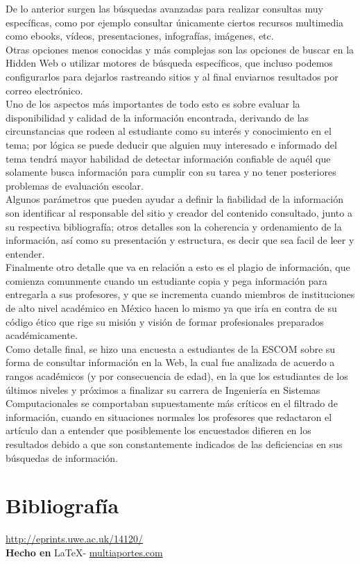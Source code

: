 \documentclass{article}
\begin{document}
{De lo anterior surgen las búsquedas avanzadas para realizar consultas muy específicas, como por ejemplo consultar únicamente ciertos recursos multimedia como ebooks, vídeos, presentaciones, infografías, imágenes, etc.
\\

Otras opciones menos conocidas y más complejas son las opciones de buscar en la Hidden Web o utilizar motores de búsqueda específicos, que incluso podemos configurarlos para dejarlos rastreando sitios y al final enviarnos resultados por correo electrónico.
\\

Uno de los aspectos más importantes de todo esto es sobre evaluar la disponibilidad y calidad de la información encontrada, derivando de las circunstancias que rodeen al estudiante como su interés y conocimiento en el tema; por lógica se puede deducir que alguien muy interesado e informado del tema tendrá mayor habilidad de detectar información confiable de aquél que solamente busca información para cumplir con su tarea y no tener posteriores problemas de evaluación escolar.
\\

Algunos parámetros que pueden ayudar a definir la fiabilidad de la información son identificar al responsable del sitio y creador del contenido consultado, junto a su respectiva bibliografía; otros detalles son la coherencia y ordenamiento de la información, así como su presentación y estructura, es decir que sea facil de leer y entender.
\\

Finalmente otro detalle que va en relación a esto es el plagio de información, que comienza comunmente cuando un estudiante copia y pega información para entregarla a sus profesores, y que se incrementa cuando miembros de instituciones de alto nivel académico en México hacen lo mismo ya que iría en contra de su código ético que rige su misión y visión de formar profesionales preparados académicamente.
\\

Como detalle final, se hizo una encuesta a estudiantes de la ESCOM sobre su forma de consultar información en la Web, la cual fue analizada de acuerdo a rangos académicos (y por consecuencia de edad), en la que los estudiantes de los últimos niveles y próximos a finalizar su carrera de Ingeniería en Sistemas Computacionales se comportaban supuestamente más críticos en el filtrado de información, cuando en situaciones normales los profesores que redactaron el artículo dan a entender que posiblemente los encuestados difieren en los resultados debido a que son constantemente indicados de las deficiencias en sus búsquedas de información.
}

\vspace{1cm}

\section*{Bibliograf\'ia}

\noindent \url{http://eprints.uwe.ac.uk/14120/}
\\

\large{\hfill \textbf{Hecho en } \LaTeX - \url{multiaportes.com}}
\end{document}
